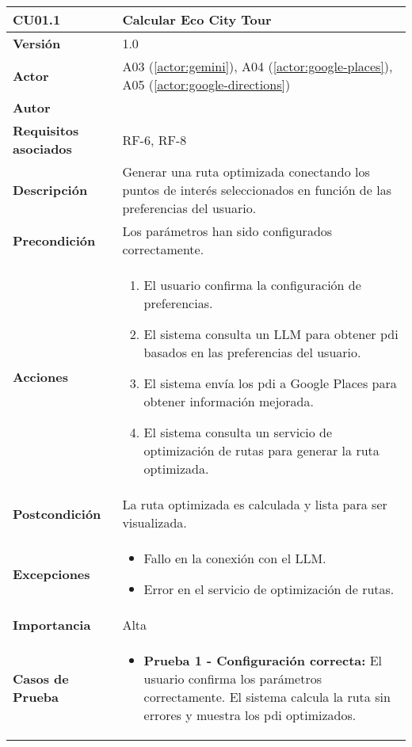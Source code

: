 \begin{table}[H]
	\centering
	\begin{tabularx}{\linewidth}{ p{} p{} }
		\toprule
		\textbf{CU01.1}    & \textbf{Calcular Eco City Tour} \\
		\toprule
		\textbf{Versión}              & 1.0    \\
		\textbf{Actor}                & A03 (\ref{actor:gemini}), A04 (\ref{actor:google-places}), A05 (\ref{actor:google-directions}) \\
		\textbf{Autor}                & \autor \\
		\textbf{Requisitos asociados} & RF-6, RF-8 \\
		\textbf{Descripción}          & Generar una ruta optimizada conectando los puntos de interés seleccionados en función de las preferencias del usuario. \\
		\textbf{Precondición}         & Los parámetros han sido configurados correctamente. \\
		\textbf{Acciones}             &
		\begin{enumerate}
			\def\labelenumi{\arabic{enumi}.}
			\tightlist
			\item El usuario confirma la configuración de preferencias.
			\item El sistema consulta un LLM para obtener \acrshort{pdi} basados en las preferencias del usuario.
			\item El sistema envía los \acrshort{pdi} a Google Places para obtener información mejorada.
			\item El sistema consulta un servicio de optimización de rutas para generar la ruta optimizada.
		\end{enumerate}\\
		\textbf{Postcondición}        & La ruta optimizada es calculada y lista para ser visualizada. \\
		\textbf{Excepciones}          & 
		\begin{itemize}
			\tightlist
			\item Fallo en la conexión con el LLM.
			\item Error en el servicio de optimización de rutas.
		\end{itemize}\\
		\textbf{Importancia}          & Alta \\
		\textbf{Casos de Prueba}      &
		\begin{itemize}
			\item \textbf{Prueba 1 - Configuración correcta:} El usuario confirma los parámetros correctamente. El sistema calcula la ruta sin errores y muestra los \acrlong{pdi} optimizados.

\end{itemize}
\end{tabularx}
\end{table}
